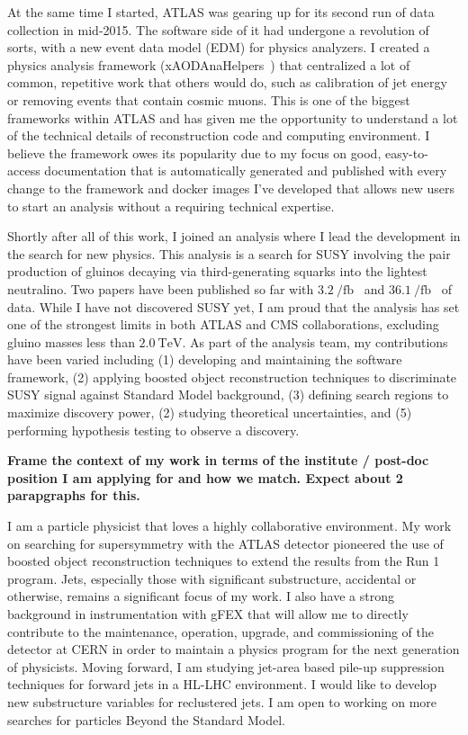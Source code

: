 \documentclass[letterpaper, 10pt]{article}
\begin{document}
At the same time I started, ATLAS was gearing up for its second run of data collection in mid-2015. The software side of it had undergone a revolution of sorts, with a new event data model (EDM) for physics analyzers. I created a physics analysis framework (xAODAnaHelpers~) that centralized a lot of common, repetitive work that others would do, such as calibration of jet energy or removing events that contain cosmic muons. This is one of the biggest frameworks within ATLAS and has given me the opportunity to understand a lot of the technical details of reconstruction code and computing environment. I believe the framework owes its popularity due to my focus on good, easy-to-access documentation that is automatically generated and published with every change to the framework and docker images I've developed that allows new users to start an analysis without a requiring technical expertise.

Shortly after all of this work, I joined an analysis where I lead the development in the search for new physics. This analysis is a search for SUSY involving the pair production of gluinos decaying via third-generating squarks into the lightest neutralino. Two papers have been published so far with $\SI{3.2}{\per\femto\barn}$~ and $\SI{36.1}{\per\femto\barn}$~ of data. While I have not discovered SUSY yet, I am proud that the analysis has set one of the strongest limits in both ATLAS and CMS collaborations, excluding gluino masses less than $\SI{2.0}{\tera\electronvolt}$. As part of the analysis team, my contributions have been varied including (1) developing and maintaining the software framework, (2) applying boosted object reconstruction techniques to discriminate SUSY signal against Standard Model background, (3) defining search regions to maximize discovery power, (2) studying theoretical uncertainties, and (5) performing hypothesis testing to observe a discovery.

\textbf{Frame the context of my work in terms of the institute / post-doc position I am applying for and how we match. Expect about 2 parapgraphs for this.}

I am a particle physicist that loves a highly collaborative environment. My work on searching for supersymmetry with the ATLAS detector pioneered the use of boosted object reconstruction techniques to extend the results from the Run 1 program. Jets, especially those with significant substructure, accidental or otherwise, remains a significant focus of my work. I also have a strong background in instrumentation with gFEX that will allow me to directly contribute to the maintenance, operation, upgrade, and commissioning of the detector at CERN in order to maintain a physics program for the next generation of physicists. Moving forward, I am studying jet-area based pile-up suppression techniques for forward jets in a HL-LHC environment. I would like to develop new substructure variables for reclustered jets. I am open to working on more searches for particles Beyond the Standard Model.

\vspace{0.5cm}

\begin{footnotesize}


\end{footnotesize}
\end{document}
